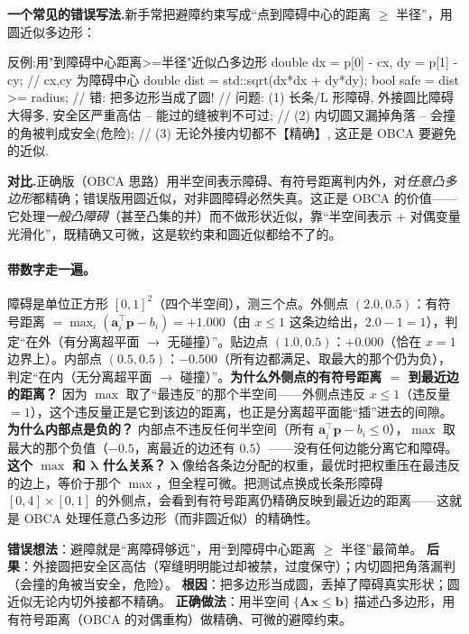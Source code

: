 \noindent{}\textbf{一个常见的错误写法.}\;新手常把避障约束写成“点到障碍中心的距离 $\ge$ 半径”，用圆近似多边形：

\begin{codebox}[C++]{反例:用"到障碍中心距离>=半径"近似凸多边形}
double dx = p[0] - cx, dy = p[1] - cy;           // cx,cy 为障碍中心
double dist = std::sqrt(dx*dx + dy*dy);
bool safe = dist >= radius;                       // 错: 把多边形当成了圆!
// 问题: (1) 长条/L 形障碍, 外接圆比障碍大得多, 安全区严重高估 -- 能过的缝被判不可过;
//       (2) 内切圆又漏掉角落 -- 会撞的角被判成安全(危险);
//       (3) 无论外接内切都不【精确】, 这正是 OBCA 要避免的近似.
\end{codebox}

\noindent\textbf{对比.}\;正确版（OBCA 思路）用半空间表示障碍、有符号距离判内外，对\emph{任意凸多边形}都精确；错误版用圆近似，对非圆障碍必然失真。这正是 OBCA 的价值——它处理\emph{一般凸障碍}（甚至凸集的并）而不做形状近似，靠“半空间表示 + 对偶变量光滑化”，既精确又可微，这是软约束和圆近似都给不了的。

\paragraph{带数字走一遍。}
障碍是单位正方形 $[0,1]^2$（四个半空间），测三个点。外侧点 $(2.0,0.5)$：有符号距离 $=\max_i(\mathbf a_i^\top\mathbf p-b_i)=+1.000$（由 $x\le 1$ 这条边给出，$2.0-1=1$），判定“在外（有分离超平面 $\to$ 无碰撞）”。贴边点 $(1.0,0.5)$：$+0.000$（恰在 $x=1$ 边界上）。内部点 $(0.5,0.5)$：$-0.500$（所有边都满足、取最大的那个仍为负），判定“在内（无分离超平面 $\to$ 碰撞）”。\textbf{为什么外侧点的有符号距离 $=$ 到最近边的距离？} 因为 $\max$ 取了“最违反”的那个半空间——外侧点违反 $x\le 1$（违反量 $=1$），这个违反量正是它到该边的距离，也正是分离超平面能“插”进去的间隙。\textbf{为什么内部点是负的？} 内部点不违反任何半空间（所有 $\mathbf a_i^\top\mathbf p-b_i\le 0$），$\max$ 取最大的那个负值（$-0.5$，离最近的边还有 $0.5$）——没有任何边能分离它和障碍。\textbf{这个 $\max$ 和 $\boldsymbol\lambda$ 什么关系？} $\boldsymbol\lambda$ 像给各条边分配的权重，最优时把权重压在最违反的边上，等价于那个 $\max$，但全程可微。把测试点换成长条形障碍 $[0,4]\times[0,1]$ 的外侧点，会看到有符号距离仍精确反映到最近边的距离——这就是 OBCA 处理任意凸多边形（而非圆近似）的精确性。

\begin{pitfall}
\textbf{错误想法}：避障就是“离障碍够远”，用“到障碍中心距离 $\ge$ 半径”最简单。\;
\textbf{后果}：外接圆把安全区高估（窄缝明明能过却被禁，过度保守）；内切圆把角落漏判（会撞的角被当安全，危险）。\;
\textbf{根因}：把多边形当成圆，丢掉了障碍真实形状；圆近似无论内切外接都不精确。\;
\textbf{正确做法}：用半空间 $\{\mathbf A\mathbf x\le\mathbf b\}$ 描述凸多边形，用有符号距离（OBCA 的对偶重构）做精确、可微的避障约束。
\end{pitfall}

